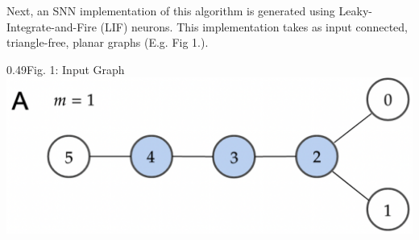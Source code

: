 Next, an SNN implementation of this algorithm is generated using Leaky-Integrate-and-Fire (LIF) neurons. This implementation takes as input connected, triangle-free, planar graphs (E.g. Fig 1.). 
\hspace{-3em}
\begin{rudifig}{0.49\hsize}{Fig. 1: Input Graph}
    \hspace{-1.5em}
    \includegraphics[width=1.1\linewidth]{latex/Images/input_graph_G_6_0_alternative1.png}
    \label{fig:input_graph}
\end{rudifig}
